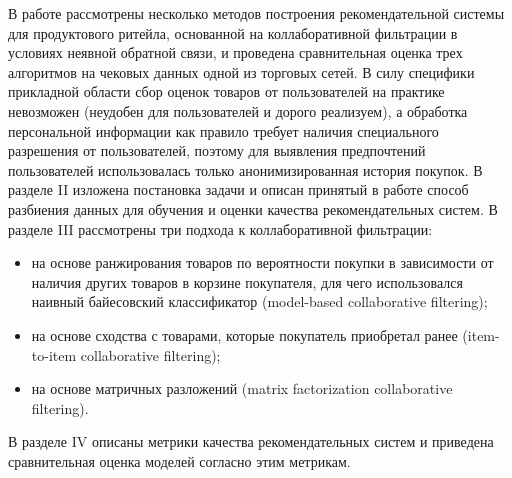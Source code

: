 \documentclass{article}
\begin{document}
В работе рассмотрены несколько методов построения рекомендательной системы для продуктового ритейла, основанной на коллаборативной фильтрации в условиях неявной обратной связи, и проведена сравнительная оценка трех алгоритмов на чековых данных одной из торговых сетей. В силу специфики прикладной области сбор оценок товаров от пользователей на практике невозможен (неудобен для пользователей и дорого реализуем), а обработка персональной информации как правило требует наличия специального разрешения от пользователей, поэтому для выявления предпочтений пользователей использовалась только анонимизированная история покупок. В разделе II изложена постановка задачи и описан принятый в работе способ разбиения данных для обучения и оценки качества рекомендательных систем. В разделе III рассмотрены три подхода к коллаборативной фильтрации:
\begin{itemize}
\item на основе ранжирования товаров по вероятности покупки в зависимости от наличия других товаров в корзине покупателя, для чего использовался наивный байесовский классификатор (model-based collaborative filtering);
\item на основе сходства с товарами, которые покупатель приобретал ранее (item-to-item collaborative filtering);
\item на основе матричных разложений (matrix factorization collaborative filtering).
\end{itemize}
В разделе IV описаны метрики качества рекомендательных систем и приведена сравнительная оценка моделей согласно этим метрикам. \par

 
\end{document}
